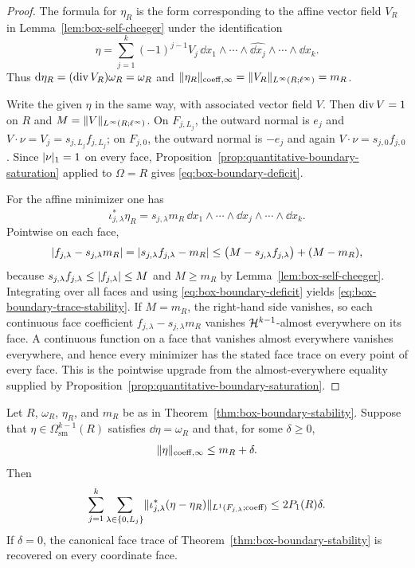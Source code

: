 \begin{proof}
The formula for $\eta_R$ is the form corresponding to the affine vector field
$V_R$ in Lemma~\ref{lem:box-self-cheeger} under the identification
\[
\eta=\sum_{j=1}^k(-1)^{j-1}V_j\,
\dd x_1\wedge\cdots\wedge\widehat{\dd x_j}\wedge\cdots\wedge\dd x_k.
\]
Thus $\mathrm{d}\eta_R=(\operatorname{div} V_R)\omega_R=\omega_R$ and
$\lVert \eta_R \rVert_{\mathrm{coeff},\infty}=\lVert V_R \rVert_{L^\infty(R;\ell^\infty)}=m_R$.

Write the given $\eta$ in the same way, with associated vector field $V$.
Then $\operatorname{div} V=1$ on $R$ and $M=\lVert V \rVert_{L^\infty(R;\ell^\infty)}$.
On $F_{j,L_j}$, the outward normal is $e_j$ and
$V\cdot\nu=V_j=s_{j,L_j}f_{j,L_j}$; on $F_{j,0}$, the outward normal is
$-e_j$ and again $V\cdot\nu=s_{j,0}f_{j,0}$. Since
$\lvert \nu \rvert_1=1$ on every face, Proposition~\ref{prop:quantitative-boundary-saturation}
applied to $\Omega=R$ gives \eqref{eq:box-boundary-deficit}.

For the affine minimizer one has
\[
\iota_{j,\lambda}^\ast\eta_R
=s_{j,\lambda}m_R\,
\dd x_1\wedge\cdots\wedge\widehat{\dd x_j}\wedge\cdots\wedge\dd x_k.
\]
Pointwise on each face,
\[
\lvert f_{j,\lambda}-s_{j,\lambda}m_R \rvert
=\lvert s_{j,\lambda}f_{j,\lambda}-m_R \rvert
\le
\bigl(M-s_{j,\lambda}f_{j,\lambda}\bigr)+(M-m_R),
\]
because $s_{j,\lambda}f_{j,\lambda}\le\lvert f_{j,\lambda} \rvert\le M$ and
$M\ge m_R$ by Lemma~\ref{lem:box-self-cheeger}. Integrating over all faces and
using \eqref{eq:box-boundary-deficit} yields
\eqref{eq:box-boundary-trace-stability}. If $M=m_R$, the right-hand side
vanishes, so each continuous face coefficient
$f_{j,\lambda}-s_{j,\lambda}m_R$ vanishes $\mathcal{H}^{k-1}$-almost everywhere on
its face. A continuous function on a face that vanishes almost everywhere
vanishes everywhere, and hence every minimizer has the stated face trace on
every point of every face.
This is the pointwise upgrade from the almost-everywhere equality supplied by
Proposition~\ref{prop:quantitative-boundary-saturation}.
\end{proof}

\begin{corollary}
\label{cor:box-delta-trace-stability}
Let $R$, $\omega_R$, $\eta_R$, and $m_R$ be as in
Theorem~\ref{thm:box-boundary-stability}. Suppose that
$\eta\in\Omega^{k-1}_{\mathrm{sm}}(R)$ satisfies $\dd\eta=\omega_R$ and that,
for some $\delta\ge0$,
\[
\lVert \eta \rVert_{\mathrm{coeff},\infty}\le m_R+\delta .
\]
Then
\begin{equation}
\label{eq:box-delta-trace-stability}
\sum_{j=1}^k\sum_{\lambda\in\{0,L_j\}}
\lVert \iota_{j,\lambda}^\ast(\eta-\eta_R) \rVert_{L^1(F_{j,\lambda};\mathrm{coeff})}
\le
2P_1(R)\delta .
\end{equation}
If $\delta=0$, the canonical face trace of
Theorem~\ref{thm:box-boundary-stability} is recovered on every coordinate
face.
\end{corollary}

